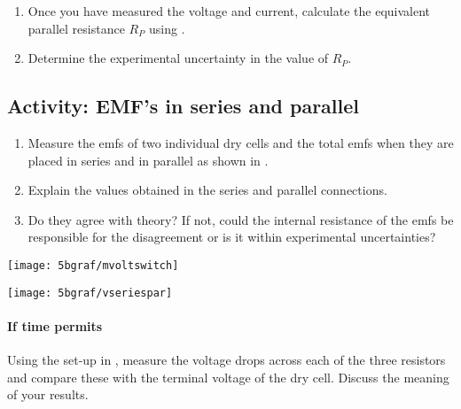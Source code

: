 \begin{multicols}{2}
\begin{enumerate}
	\item Once you have measured the voltage and current, calculate the equivalent parallel resistance $R_P$ using .
	
	\item Determine the experimental uncertainty in the value of $R_P$.
\end{enumerate}


\subsection{Activity: EMF's in series and parallel}
\begin{enumerate}
	\item Measure the emfs of two individual dry cells and the total emfs when they are placed in series and in parallel as shown in .
	
	\item Explain the values obtained in the series and parallel connections.
	
	\item Do they agree with theory?  If not, could the internal resistance of the emfs be responsible for the disagreement or is it within experimental uncertainties?
\end{enumerate}

%
%

\begin{center}
	\texttt{[image: 5bgraf/mvoltswitch]}
	\label{f:mvoltswitch}
\end{center}

\begin{center}
	\texttt{[image: 5bgraf/vseriespar]} %
	\label{f:vseriespar} %
\end{center}


\paragraph{If time permits}  Using the set-up in , measure the voltage drops across each of the three resistors and compare these with the terminal voltage of the dry cell.  Discuss the meaning of your results.

\end{multicols}


